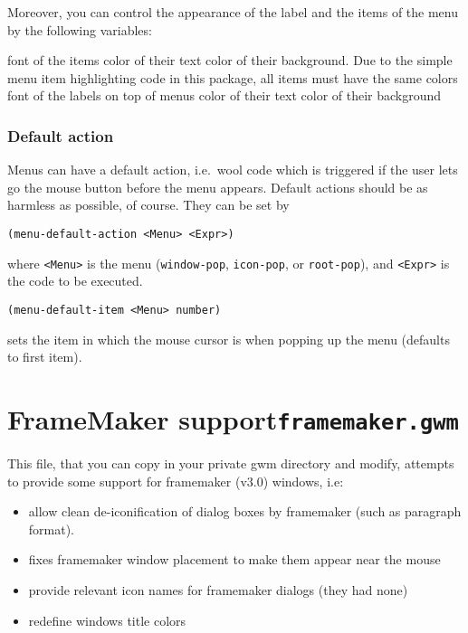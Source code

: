 Moreover, you can control the appearance of the label and the items of the 
menu by the following variables:

\begin{description}
 font of the items
 color of their text
 color of their background. Due to the simple menu
item  highlighting code in this package, all items must have the same colors
 font of the labels on top of menus
 color of their text
 color of their background
\end{description}

\subsubsection{Default action}

Menus can have a default action, i.e.\ wool code which is triggered if the user
lets go the mouse button before the menu appears. Default actions should be as
harmless as possible, of course. They can be set by 

\begin{verbatim}
(menu-default-action <Menu> <Expr>)
\end{verbatim}
where \verb|<Menu>| is the menu (\verb"window-pop", \verb"icon-pop", or
\verb"root-pop"), and \verb|<Expr>| is the code to be executed.

\begin{verbatim}
(menu-default-item <Menu> number)
\end{verbatim}
sets the item in which the mouse cursor is when popping up the menu (defaults
to first item).

\section{FrameMaker support\hfill{\tt framemaker.gwm}}
\label{framemaker}

This file, that you can copy in your private gwm directory and modify, attempts
to provide some support for framemaker (v3.0) windows, i.e:

\begin{itemize}
\item allow clean de-iconification of dialog boxes by framemaker (such as
paragraph format). 
\item fixes framemaker window placement to make them appear near the mouse
\item provide relevant icon names for framemaker dialogs (they had none)
\item redefine windows title colors
\end{itemize}

